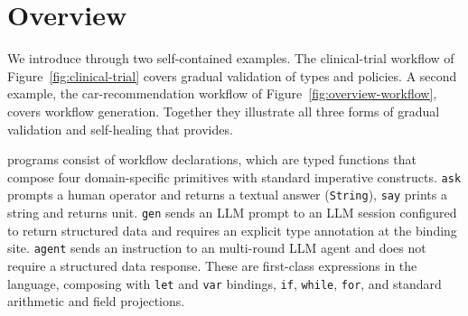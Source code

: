 \section{Overview}
\label{sec:overview}

We introduce \pact through two self-contained examples. The 
clinical-trial workflow of Figure~\ref{fig:clinical-trial} covers 
gradual validation of types and policies. A second example, the 
car-recommendation workflow of Figure~\ref{fig:overview-workflow}, 
covers workflow generation. Together they illustrate all three 
forms of gradual validation and self-healing that \pact provides.

\pact programs consist of workflow declarations, which are typed 
functions that compose four domain-specific primitives with 
standard imperative constructs. \texttt{ask} prompts a human 
operator and returns a textual answer (\texttt{String}), \texttt{say} prints a 
string and returns unit. \texttt{gen} sends an LLM prompt to an 
LLM session configured to return structured data and requires an 
explicit type annotation at the binding site. \texttt{agent} sends 
an instruction to an multi-round LLM agent and does not require a structured data response. These are first-class 
expressions in the language, composing with \texttt{let} and 
\texttt{var} bindings, \texttt{if}, \texttt{while}, \texttt{for}, 
and standard arithmetic and field projections.



